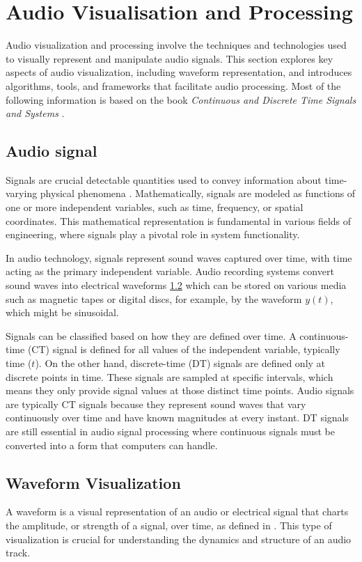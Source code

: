 \section{Audio Visualisation and Processing}
Audio visualization and processing involve the techniques and technologies used to visually represent and manipulate audio signals. This section explores key aspects of audio visualization, including waveform representation, and introduces algorithms, tools, and frameworks that facilitate audio processing. Most of the following information is based on the book \textit{Continuous and Discrete
Time Signals and Systems} \cite{OppenheimWillsky1996}.

\subsection{Audio signal}
Signals are crucial detectable quantities used to convey information about time-varying physical phenomena \cite{OppenheimWillsky1996}. 
Mathematically, signals are modeled as functions of one or more independent variables, such as time, frequency, or spatial coordinates. This mathematical representation is fundamental in various fields of engineering, where signals play a pivotal role in system functionality. 

In audio technology, signals represent sound waves captured over time, with time acting as the primary independent variable. Audio recording systems convert sound waves into electrical waveforms \ref{theory:waveform} which can be stored on various media such as magnetic tapes or digital discs, for example, by the waveform \( y(t) \), which might be sinusoidal.

Signals can be classified based on how they are defined over time. A continuous-time (CT) signal is defined for all values of the independent variable, typically time (\( t \)). On the other hand, discrete-time (DT) signals are defined only at discrete points in time. These signals are sampled at specific intervals, which means they only provide signal values at those distinct time points. Audio signals are typically CT signals because they represent sound waves that vary continuously over time and have known magnitudes at every instant. DT signals are still essential in audio signal processing where continuous signals must be converted into a form that computers can handle.

\subsection{Waveform Visualization}
\label{theory:waveform}
A waveform is a visual representation of an audio or electrical signal that charts the amplitude, or strength of a signal, over time, as defined in \cite{TechTermsWaveform}. This type of visualization is crucial for understanding the dynamics and structure of an audio track. 


